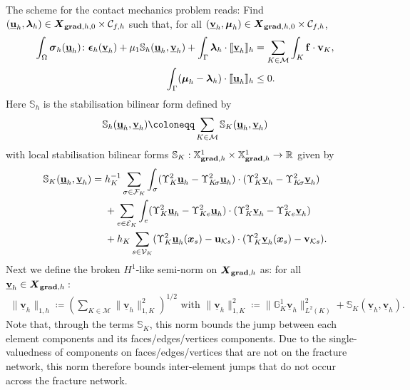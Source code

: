 \documentclass[a4paper,11pt]{article}
\theoremstyle{definition}
\theoremstyle{remark}
\newcommand{\uvec}[1]{\underline{\mathbf{#1}}}
\newcommand{\bvec}[1]{\boldsymbol{#1}}
\newcommand{\bo}[1]{\mathbf{#1}}
\newcommand{\bx}{\bvec{x}}
\def\bsig{\boldsymbol{\sigma}}
\def\be{\boldsymbol{\epsilon}}
\def\cE{\mathcal{E}}
\def\cF{\mathcal{F}}
\def\cM{\mathcal{M}}
\def\blambda{\boldsymbol{\lambda}}
\def\bmu{\boldsymbol{\mu}}
\def\dgs{\boldsymbol{X}_{{\bf grad},h}}
\def\ddgs{\boldsymbol{X}_{{\bf grad},h,0}}
\def\sjump#1{[\hskip -1.5pt[#1]\hskip -1.5pt]}
\newcommand{\Ks}{{\mathcal{K}s}}
\def\Ksig{{K\!\sigma}}
\begin{document}
The scheme for the contact mechanics problem reads: Find $(\underline{\bf u}_h,\blambda_h)\in \ddgs\times\mathcal C_{f,h}$ such that, for all $(\underline{\bf v}_h,\bmu_h)\in \ddgs\times\mathcal C_{f,h}$,
\begin{subequations}\label{eq:scheme}
\begin{align}
\int_{\Omega}\bsig_h(\underline{\bf u}_h)\colon\be_h(\underline{\bf v}_h)+\mu_{1}\mathbb S_{h}(\underline{\bf u}_h,\underline{\bf v}_h)+\int_{\Gamma}\blambda_h\cdot\sjump{\underline{\bf v}_h}_h&=\sum_{K\in\cM}\int_K {\bf f}\cdot\bo{v}_K ,\label{eq:scheme.displacement}\\
\int_{\Gamma}(\bmu_h-\blambda_h)\cdot\sjump{\underline{\bf u}_h}_h&\leq 0\label{eq:scheme.lagrange}.
\end{align}
\end{subequations}
Here $\mathbb S_{h}$ is the stabilisation bilinear form defined by
\begin{equation*}
\mathbb S_{h}(\underline{\bf u}_h,\underline{\bf v}_h)\coloneqq \sum_{K\in\cM}\mathbb S_K(\underline{\bf u}_h,\underline{\bf v}_h)
\end{equation*}
with local stabilisation bilinear forms $\mathbb S_K:\mathbb X^1_{{\bf grad},h}\times \mathbb X^1_{{\bf grad},h}\rightarrow \mathbb R$ given by 
\begin{equation}\label{eq:stabK}
  \begin{aligned}
    \mathbb S_{K}(\underline{\bf u}_h,\underline{\bf v}_h)={}&h^{-1}_K\sum_{\sigma\in\cF_K}
      \int_\sigma (\Upsilon^2_K\underline{\bf u}_h-\Upsilon^2_{\Ksig}\underline{{\bf u}}_h)\cdot(\Upsilon^2_K\underline{\bf v}_h-\Upsilon^2_{\Ksig}\underline{{\bf v}}_h)\\
    &+\sum_{e\in\cE_K}
      \int_e(\Upsilon^2_K\underline{\bf u}_h-\Upsilon^2_{K e}\underline{{\bf u}}_h)\cdot(\Upsilon^2_K\underline{\bf v}_h-\Upsilon^2_{Ke}\underline{{\bf v}}_h)\\
    &+h_K\sum_{s\in\mathcal V_K}(\Upsilon^2_K\underline{\bf u}_h(\bx_s)-\bo{u}_\Ks)\cdot(\Upsilon^2_K\underline{\bf v}_h(\bx_s)-\bo{v}_\Ks).
  \end{aligned}
\end{equation}
Next we define the broken $H^1$-like semi-norm on $\dgs$ as: for all $\uvec{v}_h\in\dgs:$
\begin{align}\label{discrete_norm}
\lVert \uvec{v}_h\rVert_{1,h}\coloneqq \left(\sum_{K\in\cM}\lVert \uvec{v}_h\rVert^2_{1,K}\right)^{1/2} \text{ with }\lVert\uvec{v}_h\rVert^2_{1,K}\coloneq \lVert \mathbb G^1_K\uvec{v}_h\rVert^2_{L^2(K)}+\mathbb S_K(\uvec{v}_h,\uvec{v}_h).
\end{align}
Note that, through the terms $\mathbb S_K$, this norm bounds the jump between each element components and its faces/edges/vertices components. Due to the single-valuedness of components on faces/edges/vertices that are not on the fracture network, this norm therefore bounds inter-element jumps that do not occur across the fracture network.
\end{document}
